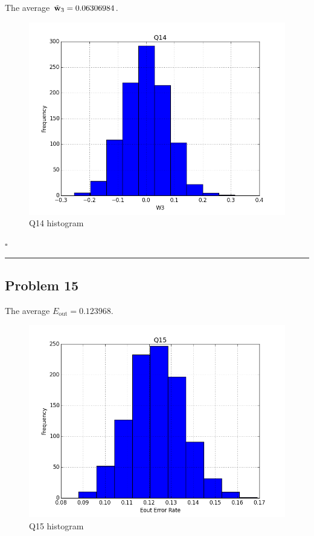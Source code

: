 \documentclass[12pt]{article}
\newcommand*{\QEDB}{\hfill\ensuremath{\square}}
\newcommand{\BF}[1]{{\bf#1}}
\newcommand{\horrule}[1]{\rule{\linewidth}{#1}}
\begin{document}
The average $\tilde{\BF{w}}_{3}={0.06306984}$.
\begin{figure}[h]
	\centering
	\includegraphics[scale=0.3]{Q14.png}
	\caption{Q14 histogram}
	\label{Q14}
\end{figure}

\QEDB

\horrule{0.5pt}

\subsection*{Problem 15}

The average $E_{\text{out}}=0.123968$.
\begin{figure}[h]
	\centering
	\includegraphics[scale=0.3]{Q15.png}
	\caption{Q15 histogram}
	\label{Q15}
\end{figure}
\end{document}
